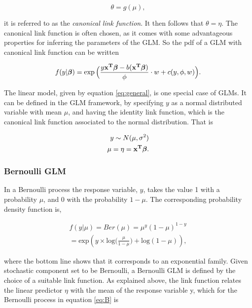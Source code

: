\begin{equation}
\theta = g(\mu),
\end{equation}

it is referred to as the \textit{canonical link function}. It then follows that $\theta=\eta$. The canonical link function is often chosen, as it comes with some advantageous properties for inferring the parameters of the GLM. So the pdf of a GLM with canonical link function can be written

\begin{equation}
   f(y|\bm{\beta}) =  \exp\Big(\frac{y  {\bf x^T} {\bm{ \beta}} - b( \bf x^T \bm{ \beta})}{\phi} \cdot w + c(y,\phi,w)\Big).
\end{equation}

The linear model, given by equation \ref{eq:general}, is one special case of GLMs. It can be defined in the GLM framework, by specifying $y$ as a normal distributed variable with mean $\mu$, and having the identity link function, which is the canonical link function associated to the normal distribution. That is

\begin{equation}
\begin{split}
y \sim N(\mu, \sigma^2) \\
\mu = \eta = \bf x^T \bm{ \beta}.
\end{split}
\end{equation}

\subsubsection{Bernoulli GLM}
\label{sec:Bernoulli}

In a Bernoulli process the response variable, $y$, takes the value 1 with a probability $\mu$, and 0 with the probability $1-\mu$. The corresponding probability density function is,

\begin{equation}
\begin{split}
\label{eq:B}
    f(y|\mu) = Ber(\mu) = \mu^{y}(1-\mu)^{1-y}\\
    = \text{exp} ( y  \times \text{log}\big(\frac{\mu}{1-\mu}\big) + \text{log}(1-\mu)),
\end{split}
\end{equation}

where the bottom line shows that it corresponds to an exponential family. Given stochastic component set to be Bernoulli, a Bernoulli GLM is defined by the choice of a suitable link function. As explained above, the link function relates the linear predictor $\eta$ with the mean of the response variable y, which for the Bernoulli process in equation \ref{eq:B} is 

